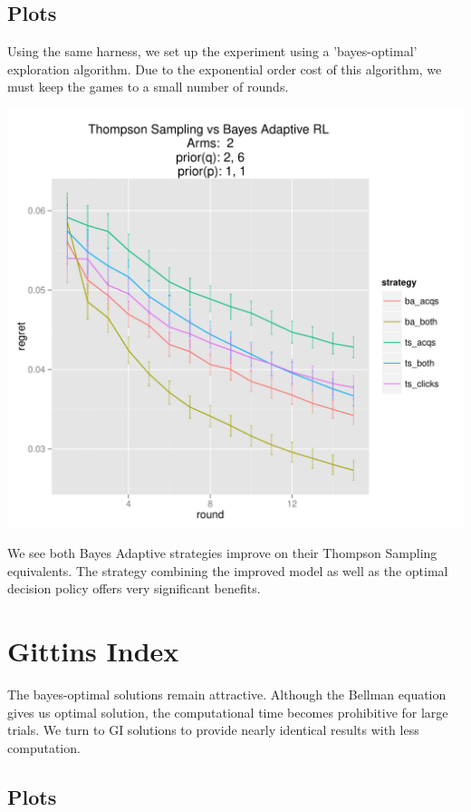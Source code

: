 \documentclass[11pt,a4,singlespacing,titlepagenumber=on]{scrreprt}
\numberwithin{equation}{chapter} %
\theoremstyle{remark}
\begin{document}
\subsection{Plots}

Using the same harness, we set up the experiment using a 'bayes-optimal' exploration algorithm. Due to the exponential order cost of this algorithm, we must keep the games to a small number of rounds. 

\includegraphics[scale=0.9]{TSvsBARL.pdf}

We see both Bayes Adaptive strategies improve on their Thompson Sampling equivalents. The strategy combining the improved model as well as the optimal decision policy offers very significant benefits.


\section{Gittins Index}

The bayes-optimal solutions remain attractive. Although the Bellman equation gives us optimal solution, the computational time becomes prohibitive for large trials. We turn to GI solutions to provide nearly identical results with less computation.

\subsection{Plots}
\end{document}
